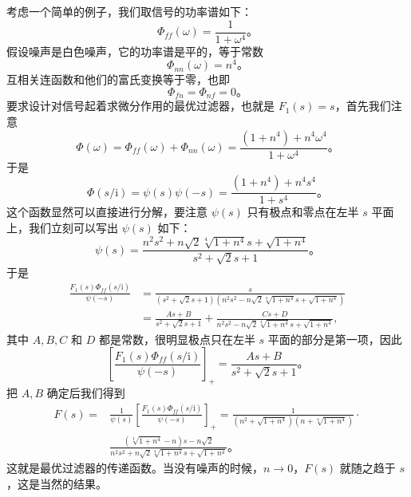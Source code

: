 考虑一个简单的例子，我们取信号的功率谱如下：
\begin{equation}
\Phi_{ff}(\omega)=\frac{1}{1+\omega^4}。
\label{eq:ch16_ex1_signal_psd}
\end{equation}
假设噪声是白色噪声，它的功率谱是平的，等于常数
\begin{equation}
\Phi_{nn}(\omega)=n^4。
\label{eq:ch16_ex1_noise_psd}
\end{equation}
互相关连函数和他们的富氏变换等于零，也即
\begin{equation}
\Phi_{fn}=\Phi_{nf}=0。
\label{eq:ch16_ex1_cross_psd_zero}
\end{equation}
要求设计对信号起着求微分作用的最优过滤器，也就是 $F_1(s)=s$，首先我们注意\begin{equation*}
\Phi(\omega)=\Phi_{ff}(\omega)+\Phi_{nn}(\omega)=\frac{(1+n^4)+n^4\omega^4}{1+\omega^4}。
\end{equation*}
于是
\begin{equation*}
\Phi(s/\mathrm{i})=\psi(s)\psi(-s)=\frac{(1+n^4)+n^4s^4}{1+s^4}。
\end{equation*}
这个函数显然可以直接进行分解，要注意 $\psi(s)$ 只有极点和零点在左半 $s$ 平面上，我们立刻可以写出 $\psi(s)$ 如下：
\begin{equation*}
\psi(s)=\frac{n^2s^2+n\sqrt{2}\sqrt[4]{1+n^4}s+\sqrt{1+n^4}}{s^2+\sqrt{2}s+1}。
\end{equation*}
于是
\begin{equation*}
\begin{aligned}
\frac{F_1(s)\Phi_{ff}(s/\mathrm{i})}{\psi(-s)} &= \frac{s}{(s^2+\sqrt{2}s+1)\left(n^2s^2-n\sqrt{2}\sqrt[4]{1+n^4}s+\sqrt{1+n^4}\right)} \\
&= \frac{As+B}{s^2+\sqrt{2}s+1}+\frac{Cs+D}{n^2s^2-n\sqrt{2}\sqrt[4]{1+n^4}s+\sqrt{1+n^4}},
\end{aligned}
\end{equation*}
其中 $A,B,C$ 和 $D$ 都是常数，很明显极点只在左半 $s$ 平面的部分是第一项，因此
\begin{equation*}
\left[\frac{F_1(s)\Phi_{ff}(s/\mathrm{i})}{\psi(-s)}\right]_+=\frac{As+B}{s^2+\sqrt{2}s+1}。
\end{equation*}
把 $A,B$ 确定后我们得到
\begin{align}
F(s)=&\frac{1}{\psi(s)}\left[\frac{F_1(s)\Phi_{ff}(s/\mathrm{i})}{\psi(-s)}\right]_+=\frac{1}{\left(n^2+\sqrt{1+n^4}\right)\left(n+\sqrt[4]{1+n^4}\right)}\cdot\nonumber \\
&\frac{\left(\sqrt[4]{1+n^4}-n\right)s-n\sqrt{2}}{n^2s^2+n\sqrt{2}\sqrt[4]{1+n^4}s+\sqrt{1+n^4}}。
\label{eq:ch16_ex1_filter_solution}
\end{align}
这就是最优过滤器的传递函数。当没有噪声的时候，$n\to0$，$F(s)$ 就随之趋于 $s$，这是当然的结果。

